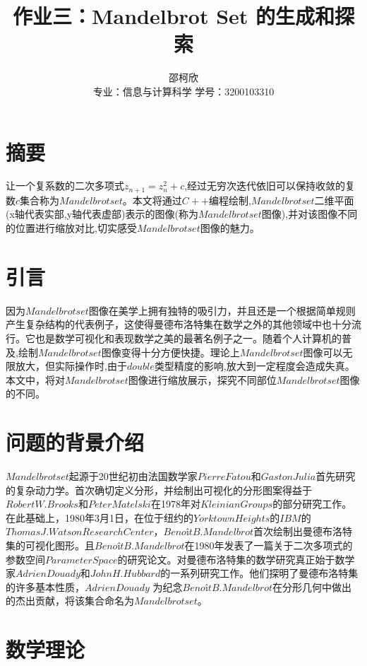 \documentclass{ctexart}
\title{作业三：Mandelbrot Set 的生成和探索}
\author{邵柯欣 \\ 专业：信息与计算科学 学号：3200103310}
\begin{document}
\maketitle

\section{摘要}

让一个复系数的二次多项式$z_{n+1}=z_n^2+c$,经过无穷次迭代依旧可以保持收敛的复数${c}$集合称为$Mandelbrot set$。本文将通过$C++$编程绘制,$Mandelbrot set$二维平面(x轴代表实部,y轴代表虚部)表示的图像(称为$Mandelbrot set$图像),并对该图像不同的位置进行缩放对比,切实感受$Mandelbrot set$图像的魅力。

\section{引言}

因为$Mandelbrot set$图像在美学上拥有独特的吸引力，并且还是一个根据简单规则产生复杂结构的代表例子，这使得曼德布洛特集在数学之外的其他领域中也十分流行。它也是数学可视化和表现数学之美的最著名例子之一。随着个人计算机的普及,绘制$Mandelbrot set$图像变得十分方便快捷。理论上$Mandelbrot set$图像可以无限放大，但实际操作时,由于$double$类型精度的影响,放大到一定程度会造成失真。本文中，将对$Mandelbrot set$图像进行缩放展示，探究不同部位$Mandelbrot set$图像的不同。

\section{问题的背景介绍}

$Mandelbrot set$起源于20世纪初由法国数学家$Pierre Fatou$和$Gaston Julia$首先研究的复杂动力学。首次确切定义分形，并绘制出可视化的分形图案得益于$Robert W. Brooks$和$Peter Matelski$在1978年对$Kleinian Groups$的部分研究工作。在此基础上，1980年3月1日，在位于纽约的$Yorktown Heights$的$IBM$的$Thomas J. Watson Research Center$，$Benoît B. Mandelbrot$首次绘制出曼德布洛特集的可视化图形。且$Benoît B. Mandelbrot$在1980年发表了一篇关于二次多项式的参数空间$Parameter Space$的研究论文。对曼德布洛特集的数学研究真正始于数学家$Adrien Douady$和$John H. Hubbard$的一系列研究工作。他们探明了曼德布洛特集的许多基本性质，$Adrien Douady$ 为纪念$Benoît B. Mandelbrot$在分形几何中做出的杰出贡献，将该集合命名为$Mandelbrot set$。

\section{数学理论}
\end{document}
